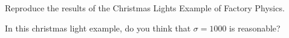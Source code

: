 \begin{exercise}
Reproduce the results of the Christmas Lights Example of Factory Physics.
\begin{comment}
  First the data. We also use a library to handle the computations for
  the normal distribution. 


\begin{verbatim}
from scipy.stats import norm
c_o = 5 - 2.5
c_s = 10 - 5
mu = 10000
sigma = 1000
X = norm(loc=mu, scale=sigma) # demand
\end{verbatim}


The result of the book is easy to produce. 


\begin{verbatim}
>>> critical_fractile = c_s / (c_o + c_s)
>>>
>>> Q_star = X.ppf(critical_fractile)
>>> Q_star
10430.727299295457

\end{verbatim}

\end{comment}
\end{exercise}

\begin{exercise}
  In this christmas light example, 
do you think that $\sigma = 1000$ is reasonable? 
  \begin{comment}
    In all honesty, I think it is way too small. I would say that
    $\sigma=5000$ is much more reasonable. The problem is that if you
    would use this larger value, i.e., $\sigma=5000$, in the normal
    distribution, the probability that the demand is
    $\P(X<0)=\Phi((X-\mu)/\sigma < 0$ is not small anymore. However,
    the demand cannot be negative, hence using the normal distribution
    as an approximation of the demand is wrong for such cases. 

    Now this happens quite often: The problems in the books are tuned
    to showcase the simple methods developed in the book. However, as
    soon you have to do something real, the simple tricks all of a
    sudden don't work anymore. 
  \end{comment}
\end{exercise}


